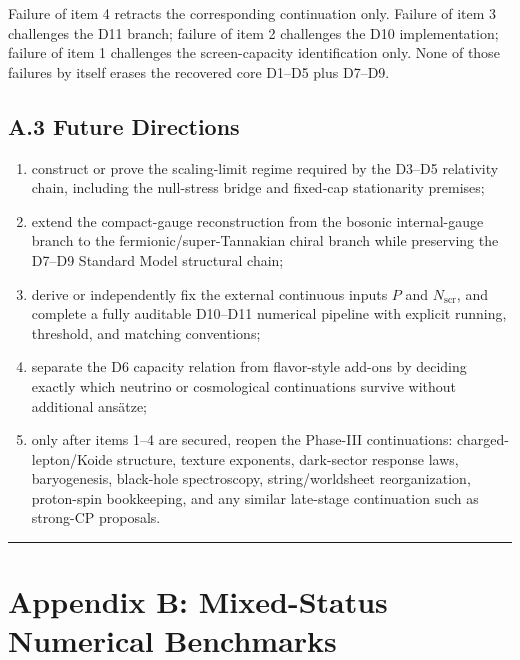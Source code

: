 Failure of item 4 retracts the corresponding continuation only. Failure of item 3 challenges the D11 branch; failure of item 2 challenges the D10 implementation; failure of item 1 challenges the screen-capacity identification only. None of those failures by itself erases the recovered core D1--D5 plus D7--D9.

\subsection{A.3 Future Directions}\label{a3-future-directions}

\begin{enumerate}
\item construct or prove the scaling-limit regime required by the D3--D5 relativity chain, including the null-stress bridge and fixed-cap stationarity premises;
\item extend the compact-gauge reconstruction from the bosonic internal-gauge branch to the fermionic/super-Tannakian chiral branch while preserving the D7--D9 Standard Model structural chain;
\item derive or independently fix the external continuous inputs $P$ and $N_{\mathrm{scr}}$, and complete a fully auditable D10--D11 numerical pipeline with explicit running, threshold, and matching conventions;
\item separate the D6 capacity relation from flavor-style add-ons by deciding exactly which neutrino or cosmological continuations survive without additional ans\"atze;
\item only after items 1--4 are secured, reopen the Phase-III continuations: charged-lepton/Koide structure, texture exponents, dark-sector response laws, baryogenesis, black-hole spectroscopy, string/worldsheet reorganization, proton-spin bookkeeping, and any similar late-stage continuation such as strong-CP proposals.
\end{enumerate}

\begin{center}\rule{0.5\linewidth}{0.5pt}\end{center}

\section{Appendix B: Mixed-Status Numerical Benchmarks}\label{appendix-b-key-numerical-values}

